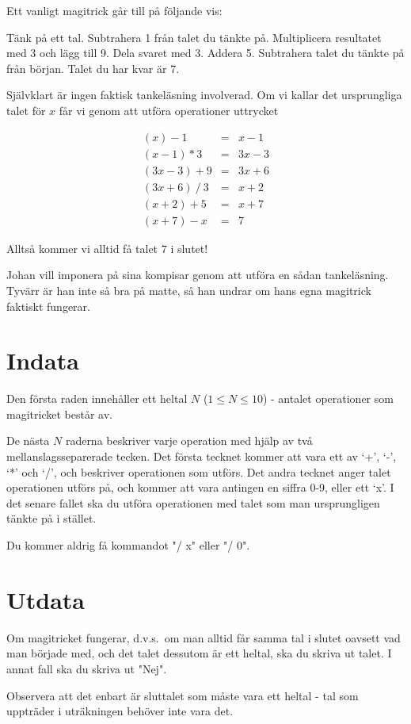 
Ett vanligt magitrick går till på följande vis:

Tänk på ett tal. Subtrahera 1 från talet du tänkte på. Multiplicera resultatet med 3 och lägg till 9. Dela svaret med 3. Addera 5. Subtrahera talet du tänkte på från början. Talet du har kvar är 7.

Självklart är ingen faktisk tankeläsning involverad. Om vi kallar det ursprungliga talet för $x$ får vi genom att utföra operationer uttrycket

\[\begin{array}{rcl}
(x) - 1 & = & x - 1 \\
(x - 1) * 3 & = & 3x - 3 \\
(3x - 3) + 9 & = & 3x + 6 \\
(3x + 6)\ /\ 3 & = & x + 2 \\
(x + 2) + 5 & = & x + 7 \\
(x + 7) - x & = & 7
\end{array}\]

Alltså kommer vi alltid få talet 7 i slutet!

Johan vill imponera på sina kompisar genom att utföra en sådan tankeläsning. Tyvärr är han inte så bra på matte, så han undrar om hans egna magitrick faktiskt fungerar.

\section*{Indata}

Den första raden innehåller ett heltal $N$ ($1 \le N \le 10$) - antalet operationer som magitricket består av.

De nästa $N$ raderna beskriver varje operation med hjälp av två mellanslagsseparerade tecken. Det första tecknet kommer att vara ett av `+', `-', `*' och `/', och beskriver operationen som utförs. Det andra tecknet anger talet operationen utförs på, och kommer att vara antingen en siffra 0-9, eller ett `x'. I det senare fallet ska du utföra operationen med talet som man ursprungligen tänkte på i stället.

Du kommer aldrig få kommandot "/ x" eller "/ 0".

\section*{Utdata}

Om magitricket fungerar, d.v.s.\ om man alltid får samma tal i slutet oavsett vad man började med, och det talet dessutom är ett heltal, ska du skriva ut talet. I annat fall ska du skriva ut "Nej".

Observera att det enbart är sluttalet som måste vara ett heltal - tal som uppträder i uträkningen behöver inte vara det.
